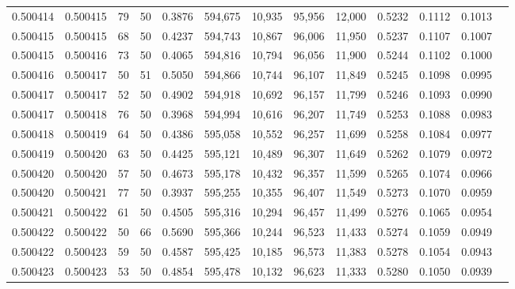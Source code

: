 \begin{tabular}{rrrrrrrrrrrrr}
0.500414 & 0.500415 &    79 &  50 &                                     0.3876 & 594,675 &  10,935 &  95,956 &  12,000 & 0.5232 & 0.1112 & 0.1013 \\
0.500415 & 0.500415 &    68 &  50 &                                     0.4237 & 594,743 &  10,867 &  96,006 &  11,950 & 0.5237 & 0.1107 & 0.1007 \\
0.500415 & 0.500416 &    73 &  50 &                                     0.4065 & 594,816 &  10,794 &  96,056 &  11,900 & 0.5244 & 0.1102 & 0.1000 \\
0.500416 & 0.500417 &    50 &  51 &                                     0.5050 & 594,866 &  10,744 &  96,107 &  11,849 & 0.5245 & 0.1098 & 0.0995 \\
0.500417 & 0.500417 &    52 &  50 &                                     0.4902 & 594,918 &  10,692 &  96,157 &  11,799 & 0.5246 & 0.1093 & 0.0990 \\
0.500417 & 0.500418 &    76 &  50 &                                     0.3968 & 594,994 &  10,616 &  96,207 &  11,749 & 0.5253 & 0.1088 & 0.0983 \\
0.500418 & 0.500419 &    64 &  50 &                                     0.4386 & 595,058 &  10,552 &  96,257 &  11,699 & 0.5258 & 0.1084 & 0.0977 \\
0.500419 & 0.500420 &    63 &  50 &                                     0.4425 & 595,121 &  10,489 &  96,307 &  11,649 & 0.5262 & 0.1079 & 0.0972 \\
0.500420 & 0.500420 &    57 &  50 &                                     0.4673 & 595,178 &  10,432 &  96,357 &  11,599 & 0.5265 & 0.1074 & 0.0966 \\
0.500420 & 0.500421 &    77 &  50 &                                     0.3937 & 595,255 &  10,355 &  96,407 &  11,549 & 0.5273 & 0.1070 & 0.0959 \\
0.500421 & 0.500422 &    61 &  50 &                                     0.4505 & 595,316 &  10,294 &  96,457 &  11,499 & 0.5276 & 0.1065 & 0.0954 \\
0.500422 & 0.500422 &    50 &  66 &                                     0.5690 & 595,366 &  10,244 &  96,523 &  11,433 & 0.5274 & 0.1059 & 0.0949 \\
0.500422 & 0.500423 &    59 &  50 &                                     0.4587 & 595,425 &  10,185 &  96,573 &  11,383 & 0.5278 & 0.1054 & 0.0943 \\
0.500423 & 0.500423 &    53 &  50 &                                     0.4854 & 595,478 &  10,132 &  96,623 &  11,333 & 0.5280 & 0.1050 & 0.0939 \\

\end{tabular}
